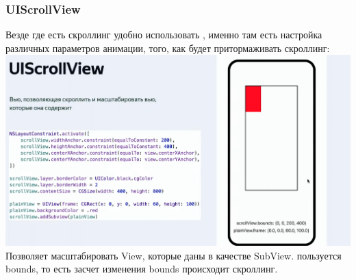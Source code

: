 \documentclass{article}
\begin{document}
    \subsubsection{UIScrollView}
    Везде где есть скроллинг удобно использовать , именно там есть настройка различных параметров анимации, того, как будет притормаживать скроллинг: 
    \newline
    \includegraphics[scale = 0.3]{pic/Снимок экрана 2023-08-01 в 00.52.10.png}
    \newline
    Позволяет масштабировать View, которые даны в качестве SubView.
    \newline
     пользуется bounds, то есть засчет изменения bounds происходит скроллинг. 
    \newline
\end{document}
